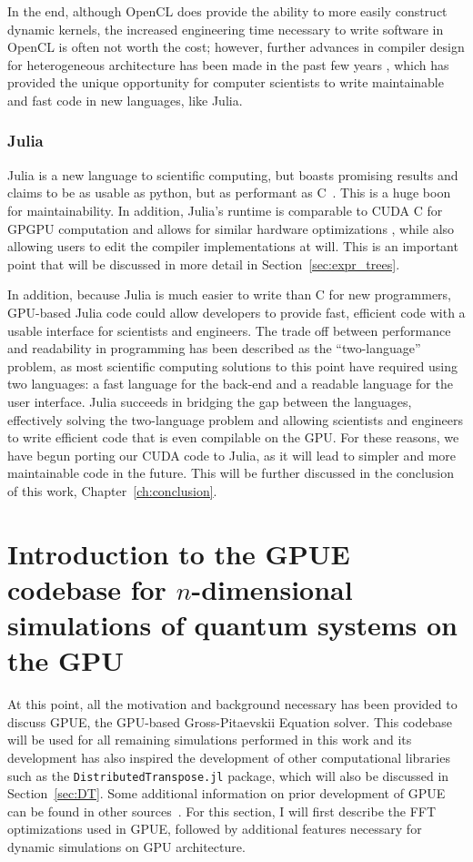 In the end, although OpenCL does provide the ability to more easily construct dynamic kernels, the increased engineering time necessary to write software in OpenCL is often not worth the cost; however, further advances in compiler design for heterogeneous architecture has been made in the past few years \cite{besard2019}, which has provided the unique opportunity for computer scientists to write maintainable and fast code in new languages, like Julia.

\subsubsection{Julia}
Julia is a new language to scientific computing, but boasts promising results and claims to be as usable as python, but as performant as C~\cite{bezanson2017}.
This is a huge boon for maintainability.
In addition, Julia's runtime is comparable to CUDA C for GPGPU computation and allows for similar hardware optimizations \cite{besard2016, besard2018}, while also allowing users to edit the compiler implementations at will.
This is an important point that will be discussed in more detail in Section~\ref{sec:expr_trees}.

In addition, because Julia is much easier to write than C for new programmers, GPU-based Julia code could allow developers to provide fast, efficient code with a usable interface for scientists and engineers.
The trade off between performance and readability in programming has been described as the ``two-language'' problem, as most scientific computing solutions to this point have required using two languages: a fast language for the back-end and a readable language for the user interface.
Julia succeeds in bridging the gap between the languages, effectively solving the two-language problem and allowing scientists and engineers to write efficient code that is even compilable on the GPU.
For these reasons, we have begun porting our CUDA code to Julia, as it will lead to simpler and more maintainable code in the future.
This will be further discussed in the conclusion of this work, Chapter~\ref{ch:conclusion}.

\section{Introduction to the GPUE codebase for $n$-dimensional simulations of quantum systems on the GPU}
\label{sec:GPUE}

At this point, all the motivation and background necessary has been provided to discuss GPUE, the GPU-based Gross-Pitaevskii Equation solver.
This codebase will be used for all remaining simulations performed in this work and its development has also inspired the development of other computational libraries such as the \texttt{DistributedTranspose.jl} package, which will also be discussed in Section~\ref{sec:DT}.
Some additional information on prior development of GPUE can be found in other sources~\cite{o2017}.
For this section, I will first describe the FFT optimizations used in GPUE, followed by additional features necessary for dynamic simulations on GPU architecture.

